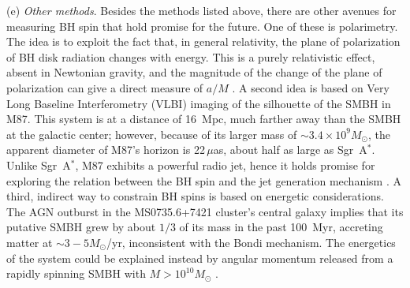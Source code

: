 \documentclass[]{iopart}
\begin{document}
\noindent
(e) {\it Other methods}. Besides the methods listed above, there are other
avenues for measuring BH spin that hold promise for the future. One of these
is polarimetry. The idea is to exploit the fact that, in general relativity,
the plane of polarization of BH disk radiation changes with energy. This is a
purely relativistic effect, absent in Newtonian gravity, and the magnitude of
the change of the plane of polarization can give a direct measure of $a/M$
\cite{Connors:1980,Remillard:2006fc}. A second idea is based on Very Long
Baseline Interferometry (VLBI) imaging of the silhouette of the SMBH in
M87. This system is at a distance of 16~Mpc, much farther away than the SMBH
at the galactic center; however, because of its larger mass of $\sim 3.4\times
10^9M_\odot$, the apparent diameter of M87's horizon is 22$\,\mu$as, about
half as large as Sgr~A$^*$. Unlike Sgr~A$^*$, M87 exhibits a powerful radio
jet, hence it holds promise for exploring the relation between the BH spin and
the jet generation mechanism \cite{Broderick:2008qf}. A third, indirect way to
constrain BH spins is based on energetic considerations. The AGN outburst in
the MS0735.6+7421 cluster's central galaxy implies that its putative SMBH grew
by about $1/3$ of its mass in the past 100~Myr, accreting matter at $\sim
3-5M_\odot$/yr, inconsistent with the Bondi mechanism. The energetics of the
system could be explained instead by angular momentum released from a rapidly
spinning SMBH with $M>10^{10}M_\odot$ \cite{McNamara:2008dy}.

\vskip 1cm




\end{document}
